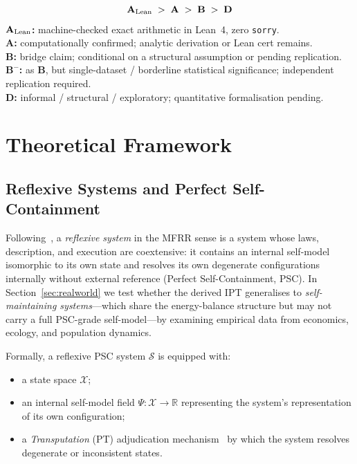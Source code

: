 \documentclass[11pt,twocolumn]{article}
\newcommand{\CatA}{\textbf{A}}
\newcommand{\CatAL}{\ensuremath{\textbf{A}_{\rm Lean}}}
\newcommand{\CatB}{\textbf{B}}
\newcommand{\CatD}{\textbf{D}}
\theoremstyle{remark}
\begin{document}
\begin{tcolorbox}[colback=gray!4,colframe=gray!50!black,
  title={\textbf{Claim-strength taxonomy}},
  fonttitle=\bfseries,left=6pt,right=6pt,top=5pt,bottom=5pt]
\small
\[
\CatAL \;>\; \CatA \;>\; \CatB \;>\; \CatD
\]
\textbf{$\CatAL$:} machine-checked exact arithmetic in Lean~4, zero \texttt{sorry}.\\
\textbf{$\CatA$:} computationally confirmed; analytic derivation or Lean cert remains.\\
\textbf{$\CatB$:} bridge claim; conditional on a structural assumption or pending replication.\\
\textbf{$\CatB^-$:} as $\CatB$, but single-dataset / borderline statistical significance; independent replication required.\\
\textbf{$\CatD$:} informal / structural / exploratory; quantitative formalisation pending.
\end{tcolorbox}

\section{Theoretical Framework}
\label{sec:framework}

\subsection{Reflexive Systems and Perfect Self-Containment}
\label{sec:framework:psc}

Following~\cite{SpivackNEMSMFRRBridge,SpivackPSCOpt}, a \emph{reflexive
system} in the MFRR
sense is a system whose laws, description, and execution are coextensive: it contains an
internal self-model isomorphic to its own state and resolves its own degenerate configurations
internally without external reference (Perfect Self-Containment, PSC). In Section~\ref{sec:realworld}
we test whether the derived IPT generalises to \emph{self-maintaining systems}---which share the
energy-balance structure but may not carry a full PSC-grade self-model---by examining empirical
data from economics, ecology, and population dynamics.

Formally, a reflexive PSC system $\mathcal{S}$ is equipped with:
\begin{itemize}
  \item a state space $\mathcal{X}$;
  \item an internal self-model field $\Psi : \mathcal{X} \to \mathbb{R}$
    representing the system's representation of its own configuration;
  \item a \emph{Transputation} (PT) adjudication mechanism~\cite{SpivackNEMSMFRRBridge} by which
    the system resolves degenerate or inconsistent states.
\end{itemize}
\end{document}
